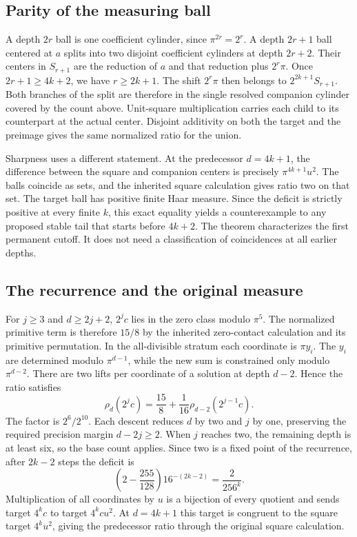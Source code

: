 \documentclass[12pt,letterpaper]{article}
\begin{document}
\subsection{Parity of the measuring ball}

A depth $2r$ ball is one coefficient cylinder, since $\pi^{2r}=2^r$. A depth $2r+1$ ball centered at $a$ splits into two disjoint coefficient cylinders at depth $2r+2$. Their centers in $S_{r+1}$ are the reduction of $a$ and that reduction plus $2^r\pi$. Once $2r+1\geq4k+2$, we have $r\geq 2k+1$. The shift $2^r\pi$ then belongs to $2^{2k+1}S_{r+1}$. Both branches of the split are therefore in the single resolved companion cylinder covered by the count above. Unit-square multiplication carries each child to its counterpart at the actual center. Disjoint additivity on both the target and the preimage gives the same normalized ratio for the union.

Sharpness uses a different statement. At the predecessor $d=4k+1$, the difference between the square and companion centers is precisely $\pi^{4k+1}u^2$. The balls coincide as sets, and the inherited square calculation gives ratio two on that set. The target ball has positive finite Haar measure. Since the deficit is strictly positive at every finite $k$, this exact equality yields a counterexample to any proposed stable tail that starts before $4k+2$. The theorem characterizes the first permanent cutoff. It does not need a classification of coincidences at all earlier depths.

\subsection{The recurrence and the original measure}
For $j\geq 3$ and $d\geq 2j+2$, $2^jc$ lies in the zero class modulo $\pi^5$. The normalized primitive term is therefore $15/8$ by the inherited zero-contact calculation and its primitive permutation. In the all-divisible stratum each coordinate is $\pi y_i$. The $y_i$ are determined modulo $\pi^{d-1}$, while the new sum is constrained only modulo $\pi^{d-2}$. There are two lifts per coordinate of a solution at depth $d-2$. Hence the ratio satisfies
\[
  \rho_d(2^jc)=\frac{15}{8}+\frac1{16}\rho_{d-2}(2^{j-1}c).
\]
The factor is $2^6/2^{10}$. Each descent reduces $d$ by two and $j$ by one, preserving the required precision margin $d-2j\geq 2$. When $j$ reaches two, the remaining depth is at least six, so the base count applies. Since two is a fixed point of the recurrence, after $2k-2$ steps the deficit is
\[
   \left(2-\frac{255}{128}\right)16^{-(2k-2)}
      =\frac{2}{256^k}.
\]
Multiplication of all coordinates by $u$ is a bijection of every quotient and sends target $4^kc$ to target $4^kcu^2$. At $d=4k+1$ this target is congruent to the square target $4^ku^2$, giving the predecessor ratio through the original square calculation.
\end{document}
